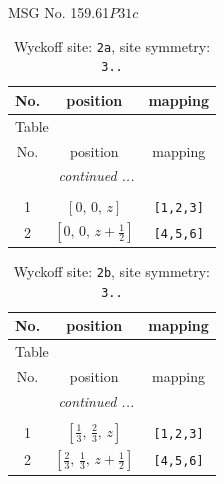 \documentclass[fleqn,8pt]{jsarticle}
\begin{document}
\setcounter{MaxMatrixCols}{32}

\renewcommand{\tablename}{Table~}
\renewcommand{\figurename}{Figure~}
\begin{center}
\LARGE
MSG No. 159.61\quad$P31c$
\end{center}
\renewcommand{\arraystretch}{1.2}
\begin{longtable}{ccc}
\caption{Wyckoff site: {\tt 2a}, site symmetry: {\tt 3..}}
 \\
 \hline \hline
No. & position & mapping \\ \hline \endfirsthead

\multicolumn{2}{l}{\tablename\ \thetable{}} \\
 \hline \hline
No. & position & mapping \\ \hline \endhead

 \hline \hline
\multicolumn{2}{r}{\footnotesize\it continued ...} \\ \endfoot

 \hline \hline
\multicolumn{2}{r}{} \\ \endlastfoot

1 & $\left[ 0,\, 0,\, z \right]$ & {\tt [1,2,3]} \\ \hline
2 & $\left[ 0,\, 0,\, z + \frac{1}{2} \right]$ & {\tt [4,5,6]} \\
\end{longtable}
\renewcommand{\arraystretch}{1.2}
\begin{longtable}{ccc}
\caption{Wyckoff site: {\tt 2b}, site symmetry: {\tt 3..}}
 \\
 \hline \hline
No. & position & mapping \\ \hline \endfirsthead

\multicolumn{2}{l}{\tablename\ \thetable{}} \\
 \hline \hline
No. & position & mapping \\ \hline \endhead

 \hline \hline
\multicolumn{2}{r}{\footnotesize\it continued ...} \\ \endfoot

 \hline \hline
\multicolumn{2}{r}{} \\ \endlastfoot

1 & $\left[ \frac{1}{3},\, \frac{2}{3},\, z \right]$ & {\tt [1,2,3]} \\ \hline
2 & $\left[ \frac{2}{3},\, \frac{1}{3},\, z + \frac{1}{2} \right]$ & {\tt [4,5,6]} \\
\end{longtable}
\renewcommand{\arraystretch}{1.2}
\end{document}
